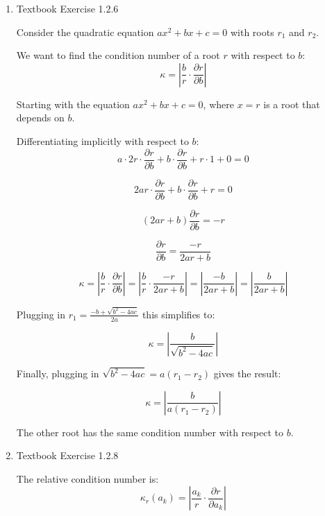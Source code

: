 \documentclass[reqno, answers]{exam}
\begin{document}
\begin{enumerate}
\begin{solution}
$$\kappa_f(x) \approx \left|\frac{2\pi nh + \frac{h^2}{2}}{\frac{h^2}{2}}\right| = \left|\frac{4\pi n}{h} + 1\right| \to \infty$$

Therefore, $\boxed{\kappa_f(x) \to \infty \text{ as } x \to 2\pi n \text{ for all nonzero integers } n}$.
\end{solution}

\item Textbook Exercise 1.2.6
\begin{solution}

Consider the quadratic equation $ax^2 + bx + c = 0$ with roots $r_1$ and $r_2$.

We want to find the condition number of a root $r$ with respect to $b$:
$$\kappa = \left|\frac{b}{r} \cdot \frac{\partial r}{\partial b}\right|$$


Starting with the equation $ax^2 + bx + c = 0$, where $x = r$ is a root that depends on $b$.

Differentiating implicitly with respect to $b$:
$$a \cdot 2r \cdot \frac{\partial r}{\partial b} + b \cdot \frac{\partial r}{\partial b} + r \cdot 1 + 0 = 0$$

$$2ar \cdot \frac{\partial r}{\partial b} + b \cdot \frac{\partial r}{\partial b} + r = 0$$

$$(2ar + b) \frac{\partial r}{\partial b} = -r$$

$$\frac{\partial r}{\partial b} = \frac{-r}{2ar + b}$$


$$\kappa = \left|\frac{b}{r} \cdot \frac{\partial r}{\partial b}\right| = \left|\frac{b}{r} \cdot \frac{-r}{2ar + b}\right| = \left|\frac{-b}{2ar + b}\right| = \left|\frac{b}{2ar + b}\right|$$


Plugging in $r_1 = \frac{-b + \sqrt{b^2 - 4ac}}{2a}$ this simplifies to:

$$\kappa = \left|\frac{b}{\sqrt{b^2 - 4ac}}\right|$$

Finally, plugging in $\sqrt{b^2 - 4ac} = a(r_1 - r_2)$ gives the result:

$$\kappa = \left|\frac{b}{a(r_1 - r_2)}\right|$$

The other root has the same condition number with respect to $b$.

\end{solution}

\item Textbook Exercise 1.2.8

\begin{solution}
The relative condition number is:
$$\kappa_r(a_k) = \left|\frac{a_k}{r} \cdot \frac{\partial r}{\partial a_k}\right|$$



\end{solution}
\end{enumerate}
\end{document}
